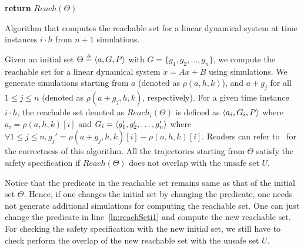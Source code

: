 \begin{algorithm}[h]
\SetAlgoVlined
{}
{\bf return} $Reach(\Theta)$\;
\caption{Algorithm that computes the reachable set for a linear dynamical system at time instances $i \cdot h$ from $n+1$ simulations.}
\label{alg:algoFullInfo}
\end{algorithm}

Given an initial set $\Theta \deq \tup{a, G, P}$ with $G = \{g_1, g_2, \ldots, g_n\}$, we compute the reachable set for a linear dynamical system $\dot{x} = Ax + B$ using simulations.
%
We generate simulations starting from $a$ (denoted as $\rho(a, h, k)$), and $a+g_j$ for all $1\leq j \leq n$ (denoted as $\rho(a+g_j, h, k)$, respectively). 
%
For a given time instance $i\cdot h$, the reachable set denoted as $Reach_i(\Theta)$ is defined as $\tup{a_i, G_i, P}$ where $a_i = \rho(a, h, k)[i]$ and $G_i = \tup{g_1', g_2', \ldots, g_n'}$ where $\forall 1\leq j \leq n, g_j' = \rho(a+g_j, h, k)[i] - \rho(a, h, k)[i]$. 
%
Readers can refer to~\cite{bak2017tacas} for the correctness of this algorithm.
%
All the trajectories starting from $\Theta$ satisfy the safety specification if  $Reach(\Theta)$ does not overlap with the unsafe set $U$.
%

\begin{remark}
\label{rem:predConst}
Notice that the predicate in the reachable set remains same as that of the initial set $\Theta$. Hence, if one changes the initial set by changing the predicate, one needs not generate additional simulations for computing the reachable set. One can just change the predicate in line~\ref{ln:reachSeti1} and compute the new reachable set. For checking the safety specification with the new initial set, we still have to check perform the overlap of the new reachable set with the unsafe set $U$.
\end{remark}

